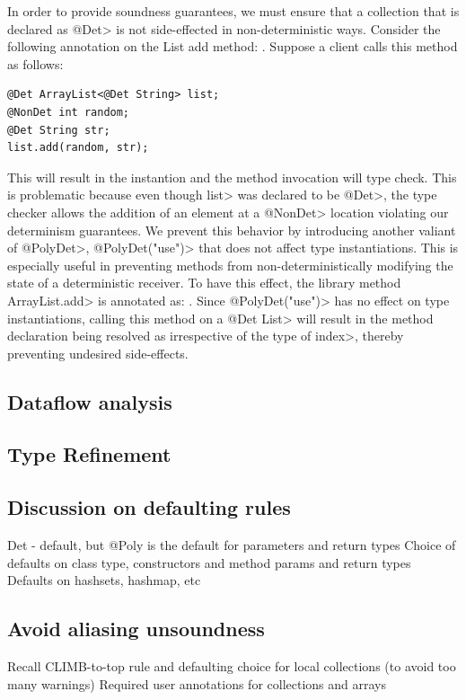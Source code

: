 In order to provide soundness guarantees, we must ensure that a collection that is
declared as \<@Det> is not side-effected in non-deterministic ways. Consider the following annotation 
on the List add method: .
Suppose a client calls this method as follows:
\begin{verbatim}
@Det ArrayList<@Det String> list;
@NonDet int random;
@Det String str;
list.add(random, str);
\end{verbatim}
This will result in the instantion  and
the method invocation will type check. This is problematic because even though \<list> was declared to be \<@Det>,
the type checker allows the addition of an element at a \<@NonDet> location violating our determinism guarantees.
We prevent this behavior by introducing another valiant of \<@PolyDet>, \<@PolyDet("use")> that does not affect
type instantiations. This is especially useful in preventing methods from non-deterministically modifying the state
of a deterministic receiver. To have this effect, the library method \<ArrayList.add> is annotated as:
.
Since \<@PolyDet("use")> has no effect on type instantiations, calling this method on a \<@Det List>
will result in the method declaration being resolved as 
irrespective of the type of \<index>, thereby preventing undesired side-effects.

\subsection{Dataflow analysis}

\subsection{Type Refinement}

\subsection{Discussion on defaulting rules}
Det - default, but @Poly is the default for parameters and return types
Choice of defaults on class type, constructors and method params and return types
Defaults on hashsets, hashmap, etc

\subsection{Avoid aliasing unsoundness}
Recall CLIMB-to-top rule and defaulting choice for local collections (to avoid too many warnings)
Required user annotations for collections and arrays

